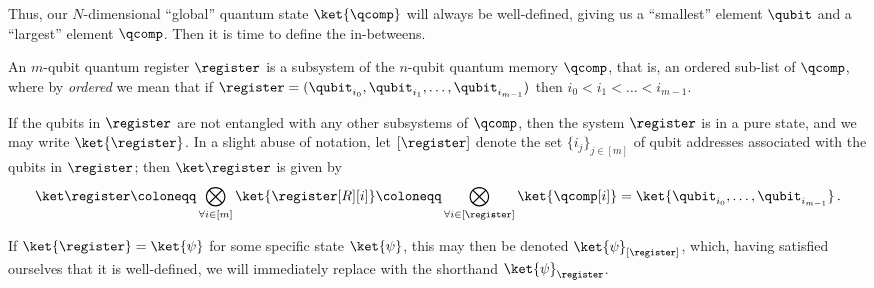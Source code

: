 
    Thus, our $N$-dimensional ``global'' quantum state $\ket{\qcomp}$ will always
      be well-defined, giving us a ``smallest'' element $\qubit$ and a
      ``largest'' element $\qcomp$. Then it is time to define the in-betweens.

    \begin{definition}\label{def:register}
      An $m$-qubit quantum register $\register$ is a subsystem of the $n$-qubit quantum
      memory $\qcomp$, that is, an ordered sub-list of $\qcomp$, where by
      \emph{ordered} we mean that if
      $\register = (\qubit_{i_0}, \qubit_{i_1}, \dots, \qubit_{i_{m-1}})$
      then $i_0 < i_1 < \dots < i_{m-1}$.
    \end{definition}

    \noindent
    If the qubits in $\register$ are not entangled with any other subsystems
      of $\qcomp$, then the system $\register$ is in a pure state, and we may
      write $\ket{\register}$. In a slight abuse of notation, let
      $[\register]$ denote the set $\{i_j\}_{j\in [m]}$ of qubit addresses
      associated with the qubits in $\register$; then $\ket\register$ is given
      by
    \[ 
      \ket\register 
      \coloneqq \bigotimes_{\forall i \in [m]} \ket{\register[R][i]}
      \coloneqq \bigotimes_{\forall i \in [\register]} \ket{\qcomp[i]}
      = \ket{\qubit_{i_0}, \ldots, \qubit_{i_{m-1}}}\, .
    \]

    \noindent
    If $\ket{\register} = \ket{\psi}$ for some specific state $\ket{\psi}$,
      this may then be denoted $\ket{\psi}_{[\register]}$,
      which, having satisfied ourselves that it is
      well-defined, we will immediately replace with the shorthand $\ket{\psi}_{\register}$.

